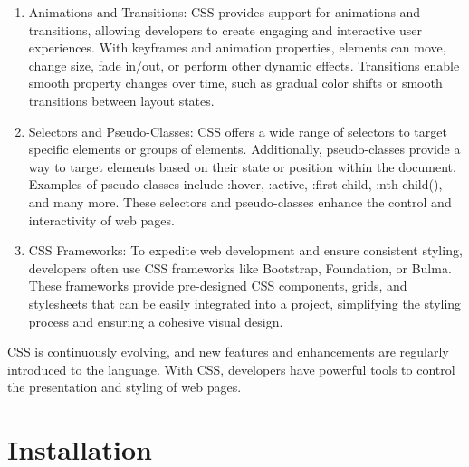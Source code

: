 \documentclass[12 pt, oneside]{book}
\begin{document}
\begin{enumerate}
  \item Animations and Transitions: CSS provides support for animations and transitions, allowing developers to create engaging and interactive user experiences. With keyframes and animation properties, elements can move, change size, fade in/out, or perform other dynamic effects. Transitions enable smooth property changes over time, such as gradual color shifts or smooth transitions between layout states.

  \item Selectors and Pseudo-Classes: CSS offers a wide range of selectors to target specific elements or groups of elements. Additionally, pseudo-classes provide a way to target elements based on their state or position within the document. Examples of pseudo-classes include :hover, :active, :first-child, :nth-child(), and many more. These selectors and pseudo-classes enhance the control and interactivity of web pages.

  \item CSS Frameworks: To expedite web development and ensure consistent styling, developers often use CSS frameworks like Bootstrap, Foundation, or Bulma. These frameworks provide pre-designed CSS components, grids, and stylesheets that can be easily integrated into a project, simplifying the styling process and ensuring a cohesive visual design.
\end{enumerate}
\bigskip
CSS is continuously evolving, and new features and enhancements are regularly introduced to the language. With CSS, developers have powerful tools to control the presentation and styling of web pages.

\section{Installation}
\end{document}
